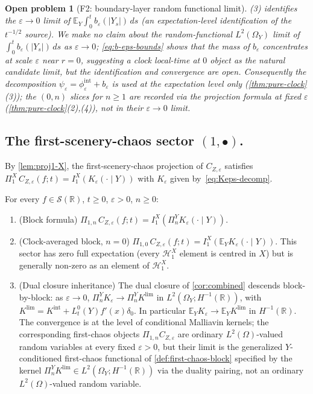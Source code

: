 \documentclass[EJP]{ejpecp}
\newtheorem{openproblem}[theorem]{Open problem}
\newcommand{\R}{\mathbb{R}}
\renewcommand{\E}{\mathbb{E}}
\newcommand{\Hilb}{\mathcal{H}}
\newcommand{\IBM}{Z}
\newcommand{\Pir}{\Pi}
\begin{document}
\begin{openproblem}[F2: boundary-layer random functional limit]
\label{flag:bdy-layer}
(3) identifies the $\varepsilon\to 0$ limit of
$\E_Y\!\int_0^t b_\varepsilon(|Y_s|)\,ds$ (an expectation-level
identification of the $t^{-1/2}$ source). We make no claim about
the random-functional $L^{2}(\Omega_Y)$ limit of
$\int_0^t b_\varepsilon(|Y_s|)\,ds$ as $\varepsilon\to 0$;
\eqref{eq:b-eps-bounds} shows that the mass of $b_\varepsilon$
concentrates at scale $\varepsilon$ near $r=0$, suggesting a clock
local-time at $0$ object as the natural candidate limit, but the
identification and convergence are open. Consequently the
decomposition $\psi_\varepsilon=\phi_\varepsilon^{\mathrm{int}}+b_\varepsilon$
is used at the expectation level only (\cref{thm:pure-clock}(3));
the $(0,n)$ slices for $n\ge 1$ are recorded via the projection
formula at fixed $\varepsilon$ (\cref{thm:pure-clock}(2),(4)), not
in their $\varepsilon\to 0$ limit.
\end{openproblem}

\subsection*{The first-scenery-chaos sector $(1,\bullet)$.}

By \cref{lem:proj1-X}, the first-scenery-chaos projection of
$C_{\IBM,\varepsilon}$ satisfies
$\Pir_1^X\,C_{\IBM,\varepsilon}(f;t)=I_1^X(K_\varepsilon(\cdot\mid Y))$
with $K_\varepsilon$ given by~\eqref{eq:Keps-decomp}.

\begin{theorem}
\label{thm:first-chaos}
For every $f\in\mathscr S(\R)$, $t\ge 0$, $\varepsilon>0$, $n\ge 0$:
\begin{enumerate}
\item (Block formula)
$\Pir_{1,n}\,C_{\IBM,\varepsilon}(f;t)=I_1^X(\Pir_n^Y K_\varepsilon(\cdot\mid Y))$.
\item (Clock-averaged block, $n=0$)
$\Pir_{1,0}\,C_{\IBM,\varepsilon}(f;t)=I_1^X(\E_Y K_\varepsilon(\cdot\mid Y))$.
This sector has zero full expectation (every $\Hilb_1^X$ element is
centred in $X$) but is generally non-zero as an element of $\Hilb_1^X$.
\item (Dual closure inheritance) The dual closure of
\cref{cor:combined} descends block-by-block: as $\varepsilon\to 0$,
$\Pir_n^Y K_\varepsilon\to\Pir_n^Y K^{\mathrm{lim}}$ in
$L^{2}(\Omega_Y;H^{-1}(\R))$, with $K^{\mathrm{lim}}=K^{\mathrm{int}}+L_t^{0}(Y)f'(x)\delta_0$.
In particular $\E_Y K_\varepsilon\to\E_Y K^{\mathrm{lim}}$ in
$H^{-1}(\R)$. The convergence is at the level of conditional
Malliavin kernels; the corresponding first-chaos objects
$\Pir_{1,n}C_{\IBM,\varepsilon}$ are ordinary
$L^{2}(\Omega)$-valued random variables at every fixed
$\varepsilon>0$, but their limit is the generalized
$Y$-conditioned first-chaos functional of
\cref{def:first-chaos-block} specified by the kernel
$\Pir_n^Y K^{\mathrm{lim}}\in L^{2}(\Omega_Y;H^{-1}(\R))$ via the
duality pairing, not an ordinary $L^{2}(\Omega)$-valued random
variable.
\end{enumerate}
\end{theorem}
\end{document}
